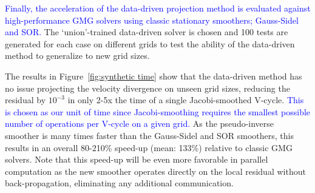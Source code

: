 \documentclass[]{elsarticle}
\begin{document}
\textcolor{blue}{Finally, the acceleration of the data-driven projection method is evaluated against high-performance GMG solvers using classic stationary smoothers; Gauss-Sidel and SOR.} The `union'-trained data-driven solver is chosen and 100 tests are generated for each case on different grids to test the ability of the data-driven method to generalize to new grid sizes.

The results in Figure~\ref{fig:synthetic time} show that the data-driven method has no issue projecting the velocity divergence on unseen grid sizes, reducing the residual by $10^{-3}$ in only 2-5x the time of a single Jacobi-smoothed V-cycle. \textcolor{blue}{This is chosen as our unit of time since Jacobi-smoothing requires the smallest possible number of operations per V-cycle on a given grid.} As the pseudo-inverse smoother is many times faster than the Gauss-Sidel and SOR smoothers, this results in an overall 80-210\% speed-up (mean: 133\%) relative to classic GMG solvers. Note that this speed-up will be even more favorable in parallel computation as the new smoother operates directly on the local residual without back-propagation, eliminating any additional communication.
\end{document}
